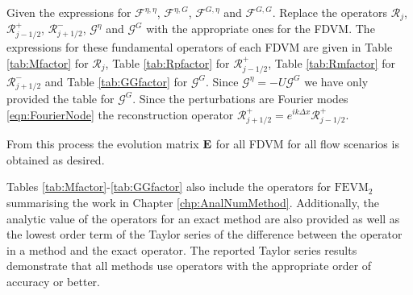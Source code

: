 Given the expressions for $\mathcal{F}^{\eta,\eta} $, $\mathcal{F}^{\eta,G}$, $\mathcal{F}^{G,\eta} $ and $\mathcal{F}^{G,G} $. Replace the operators $\mathcal{R}_j$, $\mathcal{R}^+_{j-1/2}$, $\mathcal{R}^-_{j+1/2}$, $\mathcal{G}^\eta$ and $\mathcal{G}^G$ with the appropriate ones for the FDVM. The expressions for these fundamental operators of each FDVM are given in Table \ref{tab:Mfactor} for $\mathcal{R}_j$, Table \ref{tab:Rpfactor} for $\mathcal{R}^+_{j-1/2}$, Table \ref{tab:Rmfactor} for $\mathcal{R}^-_{j+1/2}$ and Table \ref{tab:GGfactor} for $\mathcal{G}^G$. Since $\mathcal{G}^\eta = -U\mathcal{G}^G $ we have only provided the table for $\mathcal{G}^G$. Since the perturbations are Fourier modes \eqref{eqn:FourierNode} the reconstruction operator $\mathcal{R}^+_{j+1/2}= e^{ i k\Delta x}\mathcal{R}^+_{j-1/2}$. 

From this process the evolution matrix $\mathbf{E}$ for all FDVM for all flow scenarios is obtained as desired. 

Tables \ref{tab:Mfactor}-\ref{tab:GGfactor} also include the operators for $\text{FEVM}_2$ summarising the work in Chapter \ref{chp:AnalNumMethod}. Additionally, the analytic value of the operators for an exact method are also provided as well as the lowest order term of the Taylor series of the difference between the operator in a method and the exact operator. The reported Taylor series results demonstrate that all methods use operators with the appropriate order of accuracy or better. 

